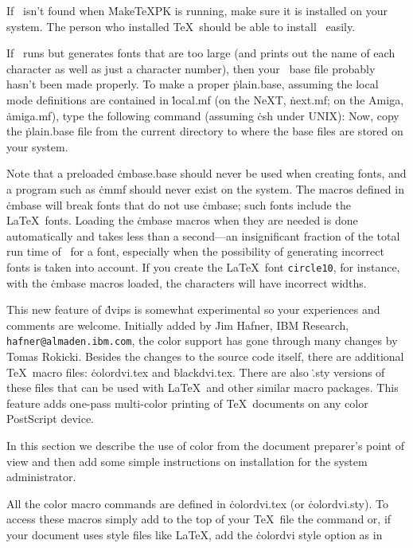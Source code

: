 If \MF\ isn't found when \.{MakeTeXPK} is running, make sure it is installed
on your system.  The person who installed \TeX\ should be able to install
\MF\ easily.

If \MF\ runs but generates fonts that are too large (and prints out the
name of each character as well as just a character number), then your
\MF\ base file probably hasn't been made properly.  To make a proper
\.{plain.base}, assuming the local mode definitions are contained in
\.{local.mf} (on the NeXT, \.{next.mf}; on the Amiga, \.{amiga.mf}),
type the following command (assuming \.{csh} under UNIX):
\noindent
Now, copy the \.{plain.base} file from the current directory to where
the base files are stored on your system.

Note that a preloaded \.{cmbase.base} should never be used when creating
fonts, and a program such as \.{cmmf} should never exist on the system.
The macros defined in \.{cmbase} will break fonts that do not use
\.{cmbase}; such fonts include the La\TeX\ fonts.  Loading the \.{cmbase}
macros when they are needed is done automatically and takes less than a
second---an insignificant fraction of the total run time of \MF\ for a
font, especially when the possibility of generating incorrect fonts is
taken into account.  If you create the La\TeX\ font {\tt circle10},
for instance, with the \.{cmbase} macros loaded, the characters will
have incorrect widths.


This new feature of \.{dvips} is somewhat experimental so your
experiences and comments are welcome.  Initially added by Jim Hafner,
IBM Research, {\tt hafner@almaden.ibm.com}, the color support has
gone through many changes by Tomas Rokicki.  Besides the changes to the
source code itself, there are additional
\TeX\ macro files: \.{colordvi.tex} and \.{blackdvi.tex}.  There are also
\.{.sty} versions of these files that can be used with La\TeX\ and
other similar macro packages.  This feature adds one-pass multi-color
printing of \TeX\ documents on any color PostScript device.

In this section we describe the use of color from the document
preparer's point of view and then add some simple instructions on
installation for the system administrator.


All the color macro commands are defined in \.{colordvi.tex} (or
\.{colordvi.sty}).  To access these macros simply add to the top of your
\TeX\ file the command
\noindent
or, if your document uses style files like La\TeX, add the \.{colordvi}
style option as in 

